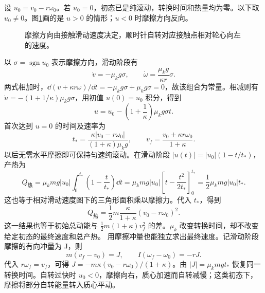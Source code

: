 \begin{solution}
设 $u_0=v_0-r\omega_0$。若 $u_0=0$，初态已是纯滚动，转换时间和热量均为零。以下取 $u_0\ne0$。图\ref{sup1:fig:d1-p9-s}画的是 $u>0$ 的情形；$u<0$ 时摩擦方向反向。

\begin{figure}[H]\centering
{}
\caption{摩擦方向由接触滑动速度决定，顺时针自转对应接触点相对轮心向左的速度。}\label{sup1:fig:d1-p9-s}
\end{figure}

以 $\sigma=\operatorname{sgn}u_0$ 表示摩擦方向，滑动阶段有
\[
\dot v=-\mu_kg\sigma,\qquad
\dot\omega=\frac{\mu_kg}{\kappa r}\sigma.
\]
两式相加时，$\dd(v+\kappa r\omega)/\dd t=-\mu_kg\sigma+\mu_kg\sigma=0$，故该组合为常量。相减则有 $\dot u=-(1+1/\kappa)\mu_kg\sigma$，用初值 $u(0)=u_0$ 积分，得到
\[
u=u_0-\left(1+\frac1\kappa\right)\mu_kg\sigma t.
\]
首次达到 $u=0$ 的时间及速率为
\[
\boxed{t_*=\frac{\kappa|v_0-r\omega_0|}{(1+\kappa)\mu_kg}},\qquad
\boxed{v_f=\frac{v_0+\kappa r\omega_0}{1+\kappa}}.
\]
以后无需水平摩擦即可保持匀速纯滚动。在滑动阶段 $|u(t)|=|u_0|(1-t/t_*)$，产热为
\[
Q_{\text{热}}=\mu_kmg|u_0|\int_0^{t_*}\left(1-\frac t{t_*}\right)\dd t
=\mu_kmg|u_0|\left[t-\frac{t^2}{2t_*}\right]_0^{t_*}
=\frac12\mu_kmg|u_0|t_*.
\]
这也等于相对滑动速度图下的三角形面积乘以摩擦力。代入 $t_*$，得到
\[
\boxed{Q_{\text{热}}=\frac12m\frac{\kappa}{1+\kappa}
(v_0-r\omega_0)^2}.
\]
这一结果也等于初始总动能与 $\tfrac12m(1+\kappa)v_f^2$ 的差。$\mu_k$ 改变转换时间，却不改变给定初态的最终速度和总产热。
用摩擦冲量也能独立求出最终速度。记滑动阶段摩擦的有向冲量为 J，则
\[
m(v_f-v_0)=J,\qquad I(\omega_f-\omega_0)=-rJ.
\]
代入 $r\omega_f=v_f$，可得 $J=-m\kappa(v_0-r\omega_0)/(1+\kappa)$。由 $|J|=\mu_kmg t_*$ 恢复同一转换时间。自转过快时 $u_0<0$，摩擦向右，质心加速而自转减慢；这类初态下，摩擦将部分自转能量转入质心平动。


\end{solution}
